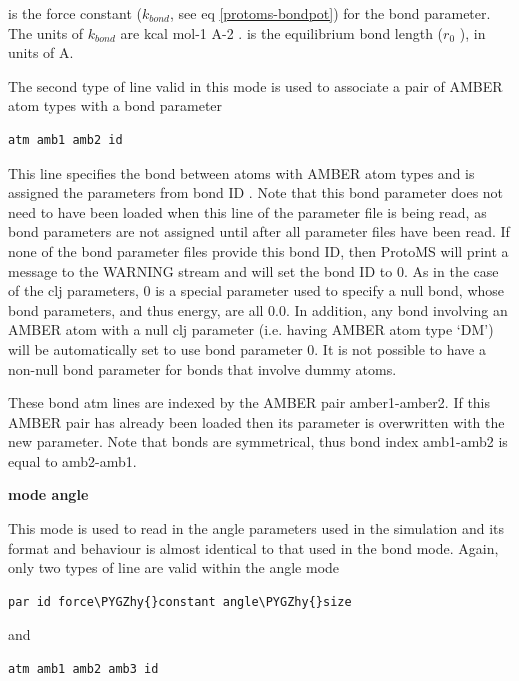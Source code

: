 \documentclass[letterpaper,10pt,english]{sphinxmanual}
\def\PYGZhy{\char`\-}
\begin{document}
 is the force constant (\(k_{bond}\), see eq \eqref{protoms-bondpot}) for the bond parameter. The units of \(k_{bond}\) are kcal mol-1 A-2 .  is the equilibrium bond length (\(r_0\) ), in units of A.

The second type of line valid in this mode is used to associate a pair of AMBER atom types with a bond parameter

\begin{Verbatim}[commandchars=\\\{\}]
atm amb1 amb2 id
\end{Verbatim}

This line specifies the bond between atoms with AMBER atom types  and  is assigned the parameters from bond ID . Note that this bond parameter does not need to have been loaded when this line of the parameter file is being read, as bond parameters are not assigned until after all parameter files have been read. If none of the bond parameter files provide this bond ID, then ProtoMS will print a message to the WARNING stream and will set the bond ID to 0. As in the case of the clj parameters, 0 is a special parameter used to specify a null bond, whose bond parameters, and thus energy, are all 0.0. In addition, any bond involving an AMBER atom with a null clj parameter (i.e. having AMBER atom type ‘DM’) will be automatically set to use bond parameter 0. It is not possible to have a non-null bond parameter for bonds that involve dummy atoms.

These bond atm lines are indexed by the AMBER pair amber1-amber2. If this AMBER pair has already been loaded then its parameter is overwritten with the new parameter. Note that bonds are symmetrical, thus bond index amb1-amb2 is equal to amb2-amb1.

\textbf{mode angle}

This mode is used to read in the angle parameters used in the simulation and its format and behaviour is almost identical to that used in the bond mode. Again, only two types of line are valid within the angle mode

\begin{Verbatim}[commandchars=\\\{\}]
par id force\PYGZhy{}constant angle\PYGZhy{}size
\end{Verbatim}

and

\begin{Verbatim}[commandchars=\\\{\}]
atm amb1 amb2 amb3 id
\end{Verbatim}
\end{document}
